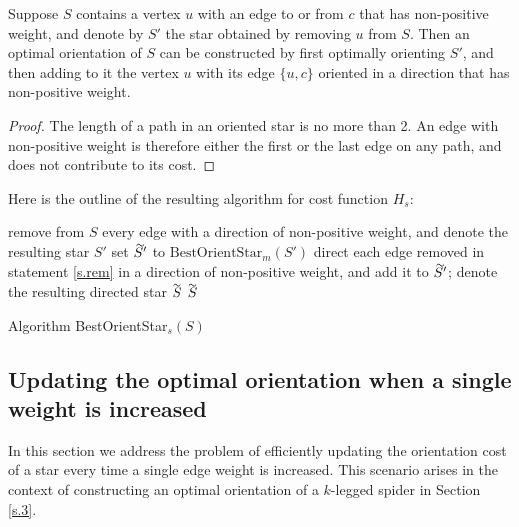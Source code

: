   \begin{lemma}
  	Suppose $S$ contains a vertex $u$ with an edge to or from $c$ that has 
  	non-positive weight, and denote by $S'$ the star obtained by removing $u$ from $S$.
  	Then an optimal orientation of $S$ can be constructed by first optimally orienting $S'$,
  	and then adding to it the vertex $u$ with its edge $\{u,c\}$ oriented in a direction
  	that has non-positive weight.
  \end{lemma} 
\begin{proof}
	The length of a path in an oriented star is no more than 2. 
	An edge with non-positive weight is therefore either the first or 
	the last edge on any path, and does not contribute to its cost. 
\end{proof}

Here is the outline of the resulting algorithm for cost function $H_s$:
 \begin{algorithm}
	remove from $S$ every edge with a direction of non-positive weight, and denote the resulting star $S'$
	\label{s.rem} \;
	set $\tildeb{S'}$ to $\mbox{BestOrientStar}_m (S')$\;
	direct each edge removed in statement \ref{s.rem} in a direction of non-positive weight,
	and add it to $\tildeb{S'}$;
	denote the resulting directed star $\tildeb{S}$\;
	\Return $\tildeb{S}$\;
	\caption{Algorithm BestOrientStar$_s (S)$}
	\label{algo:os-m}
\end{algorithm}
\newpage

\subsection{Updating the optimal orientation when a single weight is increased}\label{s.star.update}
In this section we address the problem of efficiently updating the orientation 
cost of a star 
every time a single edge weight is increased. This scenario arises in the context of
constructing an optimal orientation of a $k$-legged spider in Section \ref{s.3}.

